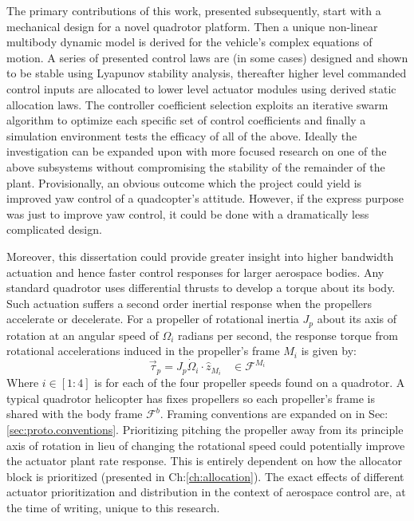 \par
The primary contributions of this work, presented subsequently, start with a mechanical design for a novel quadrotor platform. Then a unique non-linear multibody dynamic model is derived for the vehicle's complex equations of motion. A series of presented control laws are (in some cases) designed and shown to be stable using Lyapunov stability analysis, thereafter higher level commanded control inputs are allocated to lower level actuator modules using derived static allocation laws. The controller coefficient selection exploits an iterative swarm algorithm to optimize each specific set of control coefficients and finally a simulation environment tests the efficacy of all of the above. Ideally the investigation can be expanded upon with more focused research on one of the above subsystems without compromising the stability of the remainder of the plant. Provisionally, an obvious outcome which the project could yield is improved yaw control of a quadcopter's attitude. However, if the express purpose was just to improve yaw control, it could be done with a dramatically less complicated design.
\par
Moreover, this dissertation could provide greater insight into higher bandwidth actuation and hence faster control responses for larger aerospace bodies. Any standard quadrotor uses differential thrusts to develop a torque about its body. Such actuation suffers a second order inertial response when the propellers accelerate or decelerate. For a propeller of rotational inertia $J_p$ about its axis of rotation at an angular speed of $\Omega_i$ radians per second, the response torque from rotational accelerations induced in the propeller's frame $M_i$ is given by:
\begin{equation}
\vec{\tau}_{p}=J_p\dot{\Omega}_i\cdot\hat{z}_{M_i}~~~~\in\mathcal{F}^{M_i}
\end{equation}
Where $i\in[1:4]$ is for each of the four propeller speeds found on a quadrotor. A typical quadrotor helicopter has fixes propellers so each propeller's frame is shared with the body frame $\mathcal{F}^{b}$. Framing conventions are expanded on in Sec:\ref{sec:proto.conventions}. Prioritizing pitching the propeller away from its principle axis of rotation in lieu of changing the rotational speed could potentially improve the actuator plant rate response. This is entirely dependent on how the allocator block is prioritized (presented in Ch:\ref{ch:allocation}). The exact effects of different actuator prioritization and distribution in the context of aerospace control are, at the time of writing, unique to this research.
\newpage
